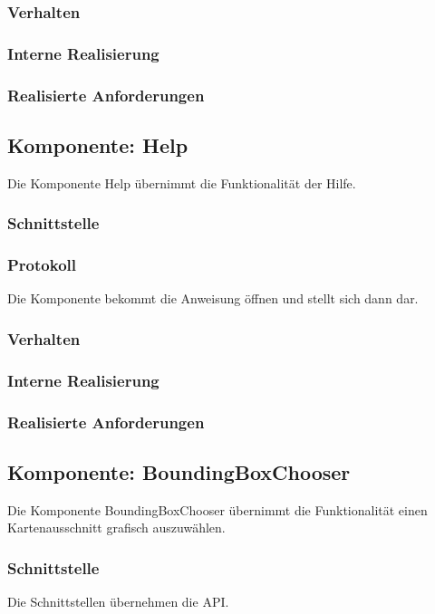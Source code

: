 \documentclass[a4paper,12pt]{scrartcl}
\begin{document}
\subsubsection{Verhalten}
\subsubsection{Interne Realisierung}
\subsubsection{Realisierte Anforderungen}


\subsection{Komponente: Help}
Die Komponente Help übernimmt die Funktionalität der Hilfe.
\subsubsection{Schnittstelle}
\subsubsection{Protokoll}
Die Komponente bekommt die Anweisung öffnen und stellt sich dann dar.
\subsubsection{Verhalten}
\subsubsection{Interne Realisierung}
\subsubsection{Realisierte Anforderungen}

\subsection{Komponente: BoundingBoxChooser}
Die Komponente BoundingBoxChooser übernimmt die Funktionalität einen Kartenausschnitt grafisch auszuwählen.
\subsubsection{Schnittstelle}
Die Schnittstellen übernehmen die API.
\end{document}
